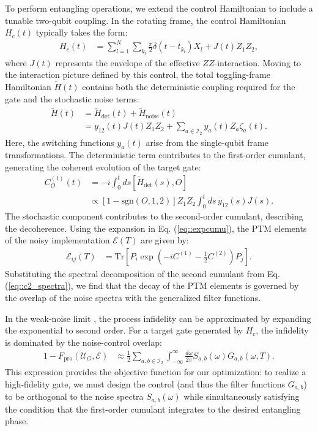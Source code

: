 \documentclass[%
 reprint,
superscriptaddress,
 amsmath,amssymb,
 aps,
pra,
floatfix,
]{revtex4-2}
\begin{document}
To perform entangling operations, we extend the control Hamiltonian to include a tunable two-qubit coupling. In the rotating frame, the control Hamiltonian $H_c(t)$ typically takes the form:
\begin{align}
\label{eq::CZHam}
    H_c(t) &= \sum_{l=1}^N \sum_{k_l} \frac{\pi}{2} \delta(t-t_{k_l}) X_l + J(t) Z_1 Z_2,
\end{align}
where $J(t)$ represents the envelope of the effective $ZZ$-interaction.
Moving to the interaction picture defined by this control, the total toggling-frame Hamiltonian $\tilde{H}(t)$ contains both the deterministic coupling required for the gate and the stochastic noise terms:
\begin{align}
    \tilde{H}(t) &= \tilde{H}_{\text{det}}(t) + \tilde{H}_{\text{noise}}(t) \nonumber \\
    &= y_{12}(t)J(t)Z_1Z_2 + \sum_{a \in \mathcal{I}_2} y_{a}(t) Z_a \zeta_{a}(t).
\end{align}
Here, the switching functions $y_a(t)$ arise from the single-qubit frame transformations. The deterministic term contributes to the first-order cumulant, generating the coherent evolution of the target gate:
\begin{align}
    C_{O}^{(1)}(t) &= -i \int_0^t ds \left[\tilde{H}_{\text{det}}(s), O\right] \nonumber \\
    &\propto [1-\text{sgn}(O,1,2)] Z_1 Z_2 \int_0^t ds \, y_{12}(s) J(s).
\end{align}
The stochastic component contributes to the second-order cumulant, describing the decoherence. Using the expansion in Eq. (\ref{eq::expcumu}), the PTM elements of the noisy implementation $\mathcal{E}(T)$ are given by:
\begin{align}
    \mathcal{E}_{ij}(T) &= \text{Tr}\left[P_i \exp\left( -iC^{(1)} - \frac{1}{2}C^{(2)} \right) P_j \right].
\end{align}
Substituting the spectral decomposition of the second cumulant from Eq. (\ref{eq::c2_spectra}), we find that the decay of the PTM elements is governed by the overlap of the noise spectra with the generalized filter functions.

In the weak-noise limit \cite{tsai_benchmarking_2024}, the process infidelity can be approximated by expanding the exponential to second order. For a target gate generated by $H_c$, the infidelity is dominated by the noise-control overlap:
\begin{align}
    1 - F_{\text{pro}}(\mathcal{U}_G, \mathcal{E}) &\approx \frac{1}{2} \sum_{a,b \in \mathcal{I}_2} \int_{-\infty}^{\infty} \frac{d\omega}{2\pi} S_{a,b}(\omega) G_{a,b}(\omega, T).
\end{align}
This expression provides the objective function for our optimization: to realize a high-fidelity gate, we must design the control (and thus the filter functions $G_{a,b}$) to be orthogonal to the noise spectra $S_{a,b}(\omega)$ while simultaneously satisfying the condition that the first-order cumulant integrates to the desired entangling phase.
\end{document}
